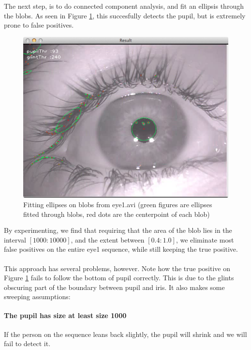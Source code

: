 \documentclass[a4paper,11pt]{article}
\begin{document}
The next step, is to do connected component analysis, and fit an ellipsis through the blobs. As seen in Figure \ref{fig:eye1_unfiltered}, this succesfully detects the pupil, but is extremely prone to false positives.

\begin{figure}[H]
  \centering
  \includegraphics[scale=0.3]{eye1_unfiltered}
  \caption{Fitting ellipses on blobs from eye1.avi (green figures are ellipses fitted through blobs, red dots are the centerpoint of each blob)}
  \label{fig:eye1_unfiltered}
\end{figure}

By experimenting, we find that requiring that the area of the blob lies in the interval $[1000:10000]$, and the extent between $[0.4:1.0]$, we eliminate most false positives on the entire eye1 sequence, while still keeping the true positive.

\paragraph{}
This approach has several problems, however. Note how the true positive on Figure \ref{fig:eye1_unfiltered} fails to follow the bottom of pupil correctly. This is due to the glints obscuring part of the boundary between pupil and iris. It also makes some sweeping assumptions:

\paragraph{The pupil has size at least size 1000}
If the person on the sequence leans back slightly, the pupil will shrink and we will fail to detect it.
\end{document}
